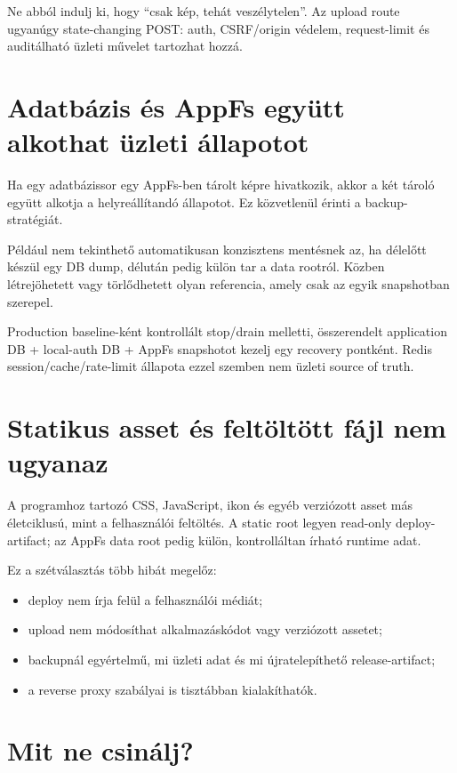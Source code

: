 Ne abból indulj ki, hogy ``csak kép, tehát veszélytelen''. Az upload route ugyanúgy state-changing POST: auth, CSRF/origin védelem, request-limit és auditálható üzleti művelet tartozhat hozzá.

\section{Adatbázis és AppFs együtt alkothat üzleti állapotot}

Ha egy adatbázissor egy AppFs-ben tárolt képre hivatkozik, akkor a két tároló együtt alkotja a helyreállítandó állapotot. Ez közvetlenül érinti a backup-stratégiát.

Például nem tekinthető automatikusan konzisztens mentésnek az, ha délelőtt készül egy DB dump, délután pedig külön tar a data rootról. Közben létrejöhetett vagy törlődhetett olyan referencia, amely csak az egyik snapshotban szerepel.

Production baseline-ként kontrollált stop/drain melletti, összerendelt application DB + local-auth DB + AppFs snapshotot kezelj egy recovery pontként. Redis session/cache/rate-limit állapota ezzel szemben nem üzleti source of truth.

\section{Statikus asset és feltöltött fájl nem ugyanaz}

A programhoz tartozó CSS, JavaScript, ikon és egyéb verziózott asset más életciklusú, mint a felhasználói feltöltés. A static root legyen read-only deploy-artifact; az AppFs data root pedig külön, kontrolláltan írható runtime adat.

Ez a szétválasztás több hibát megelőz:

\begin{itemize}
  \item deploy nem írja felül a felhasználói médiát;
  \item upload nem módosíthat alkalmazáskódot vagy verziózott assetet;
  \item backupnál egyértelmű, mi üzleti adat és mi újratelepíthető release-artifact;
  \item a reverse proxy szabályai is tisztábban kialakíthatók.
\end{itemize}

\section{Mit ne csinálj?}

